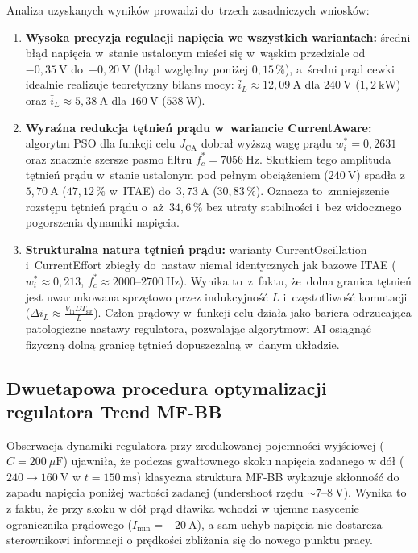 Analiza uzyskanych wyników prowadzi do~trzech zasadniczych wniosków:
\begin{enumerate}
    \item \textbf{Wysoka precyzja regulacji napięcia we wszystkich wariantach:} średni błąd napięcia w~stanie ustalonym mieści się w~wąskim przedziale od~$-0{,}35~\mathrm{V}$ do~$+0{,}20~\mathrm{V}$ (błąd względny poniżej $0{,}15\,\%$), a~średni prąd cewki idealnie realizuje teoretyczny bilans mocy: $\bar{i}_L \approx 12{,}09~\mathrm{A}$ dla $240~\mathrm{V}$ ($1{,}2~\mathrm{kW}$) oraz $\bar{i}_L \approx 5{,}38~\mathrm{A}$ dla $160~\mathrm{V}$ ($538~\mathrm{W}$).
    \item \textbf{Wyraźna redukcja tętnień prądu w~wariancie CurrentAware:} algorytm PSO dla funkcji celu $J_{\mathrm{CA}}$ dobrał wyższą wagę prądu $w_i^* = 0{,}2631$ oraz znacznie szersze pasmo filtru $f_c^* = 7056~\mathrm{Hz}$. Skutkiem tego amplituda tętnień prądu w~stanie ustalonym pod pełnym obciążeniem ($240~\mathrm{V}$) spadła z~$5{,}70~\mathrm{A}$ ($47{,}12\,\%$ w~ITAE) do~$3{,}73~\mathrm{A}$ ($30{,}83\,\%$). Oznacza to~zmniejszenie rozstępu tętnień prądu o~aż~$34{,}6\,\%$ bez utraty stabilności i~bez widocznego pogorszenia dynamiki napięcia.
    \item \textbf{Strukturalna natura tętnień prądu:} warianty CurrentOscillation i~CurrentEffort zbiegły do~nastaw niemal identycznych jak bazowe ITAE ($w_i^* \approx 0{,}213$, $f_c^* \approx 2000$--$2700~\mathrm{Hz}$). Wynika to~z~faktu, że~dolna granica tętnień jest uwarunkowana sprzętowo przez indukcyjność $L$ i~częstotliwość komutacji ($\Delta i_L \approx \frac{V_{\mathrm{in}} D T_{\mathrm{sw}}}{L}$). Człon prądowy w~funkcji celu działa jako bariera odrzucająca patologiczne nastawy regulatora, pozwalając algorytmowi AI osiągnąć fizyczną dolną granicę tętnień dopuszczalną w~danym układzie.
\end{enumerate}

\subsection{Dwuetapowa procedura optymalizacji regulatora Trend MF-BB}
\label{subsec:pso-two-stage}

Obserwacja dynamiki regulatora przy zredukowanej pojemności wyjściowej ($C = 200~\mu\mathrm{F}$) ujawniła, że podczas gwałtownego skoku napięcia zadanego w dół ($240 \to 160~\mathrm{V}$ w $t = 150~\mathrm{ms}$) klasyczna struktura MF-BB wykazuje skłonność do zapadu napięcia poniżej wartości zadanej (undershoot rzędu $\sim 7$--$8~\mathrm{V}$). Wynika to z faktu, że przy skoku w dół prąd dławika wchodzi w ujemne nasycenie ogranicznika prądowego ($I_{\min} = -20~\mathrm{A}$), a sam uchyb napięcia nie dostarcza sterownikowi informacji o prędkości zbliżania się do nowego punktu pracy.

